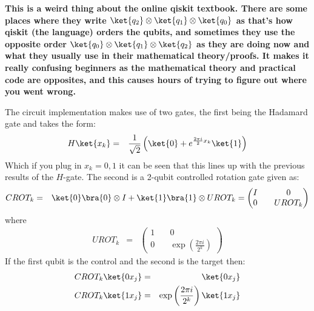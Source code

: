 \documentclass[preprint,aps,prd,nofootinbib,superscriptaddress]{revtex4-2}
\begin{document}
%
\textbf{This is a weird thing about the online qiskit textbook. There are some places where they write $\ket{q_2}\otimes\ket{q_1} \otimes \ket{q_0}$ as that's how qiskit (the language) orders the qubits, and sometimes they use the opposite order $\ket{q_0}\otimes\ket{q_1} \otimes \ket{q_2}$ as they are doing now and what they usually use in their mathematical theory/proofs. It makes it really confusing beginners as the mathematical theory and practical code are opposites, and this causes hours of trying to figure out where you went wrong.}
%

%
The circuit implementation makes use of two gates, the first being the Hadamard gate and takes the form:
%
\begin{eqnarray} 
H \ket{x_k} &=& \frac{1}{\sqrt{2}} \left( \ket{0} + e^{\frac{2\pi i}{2} x_k} \ket{1} \right)
\end{eqnarray}
%
Which if you plug in $x_k = 0, 1$ it can be seen that this lines up with the previous results of the $H$-gate. The second is a 2-qubit controlled rotation gate given as:
%
\begin{eqnarray} 
CROT_k &=& \ket{0}\bra{0} \otimes I + \ket{1}\bra{1} \otimes UROT_k = 
\begin{pmatrix}
I \quad & 0 \\
0 \quad & UROT_k
\end{pmatrix}
\end{eqnarray}
%
where 
%
\begin{eqnarray} 
UROT_k &=&
\begin{pmatrix}
1 \quad & 0 \\
0 \quad & \exp\left(\frac{2\pi i}{2^k} \right)
\end{pmatrix}
\end{eqnarray}
%
If the first qubit is the control and the second is the target then:
%
\begin{eqnarray} 
CROT_k \ket{0x_j} &=& \ket{0x_j}
\nonumber \\
CROT_k \ket{1x_j} &=& \exp\left(\frac{2\pi i}{2^k} \right) \ket{1x_j}
\end{eqnarray}
%
\end{document}

